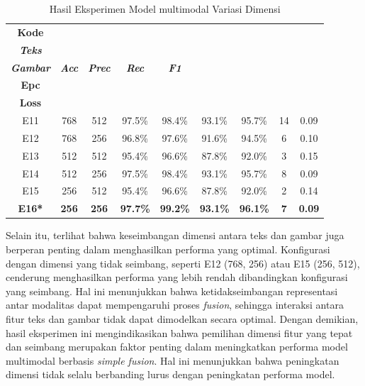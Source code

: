 \begin{table}[H]
    \centering
    \caption{Hasil Eksperimen Model multimodal Variasi Dimensi}
    \label{table:4.multimodal_dimensi}
    \small
    \setlength{\tabcolsep}{4pt} %
    \renewcommand{\arraystretch}{1.2}
    
   
        \begin{tabular}{ccccccccc}
            \hline
            \textbf{Kode} & \shortstack{\textbf{\textit{Dimensi}}\\\textbf{\textit{Teks}}} & \shortstack{\textbf{\textit{Dimensi}}\\\textbf{\textit{Gambar}}} & \textbf{\textit{Acc}} & \textbf{\textit{Prec}} & \textbf{\textit{Rec}} & \textbf{\textit{F1}} & \shortstack{\textbf{Best}\\\textbf{Epc}} & \shortstack{\textbf{Val}\\\textbf{Loss}} \\
            \hline
            E11 & 768 & 512 & 97.5\% & 98.4\% & 93.1\% & 95.7\% & 14 & 0.09 \\
            E12 & 768 & 256 & 96.8\% & 97.6\% & 91.6\% & 94.5\% & 6 & 0.10 \\
            E13 & 512 & 512 & 95.4\% & 96.6\% & 87.8\% & 92.0\% & 3 & 0.15 \\
            E14 & 512 & 256 & 97.5\% & 98.4\% & 93.1\% & 95.7\% & 8 & 0.09 \\
            E15 & 256 & 512 & 95.4\% & 96.6\% & 87.8\% & 92.0\% & 2 & 0.14 \\
            \textbf{E16*} & \textbf{256} & \textbf{256} & \textbf{97.7\%} & \textbf{99.2\%} & \textbf{93.1\%} & \textbf{96.1\%} & \textbf{7} & \textbf{0.09} \\
            \hline
        \end{tabular}
    
\end{table}

Selain itu, terlihat bahwa keseimbangan dimensi antara teks dan gambar juga berperan penting dalam menghasilkan performa yang optimal. Konfigurasi dengan dimensi yang tidak seimbang, seperti E12 (768, 256) atau E15 (256, 512), cenderung menghasilkan performa yang lebih rendah dibandingkan konfigurasi yang seimbang. Hal ini menunjukkan bahwa ketidakseimbangan representasi antar modalitas dapat mempengaruhi proses \textit{fusion}, sehingga interaksi antara fitur teks dan gambar tidak dapat dimodelkan secara optimal. Dengan demikian, hasil eksperimen ini mengindikasikan bahwa pemilihan dimensi fitur yang tepat dan seimbang merupakan faktor penting dalam meningkatkan performa model multimodal berbasis \textit{simple fusion}. Hal ini menunjukkan bahwa peningkatan dimensi tidak selalu berbanding lurus dengan peningkatan performa model.



